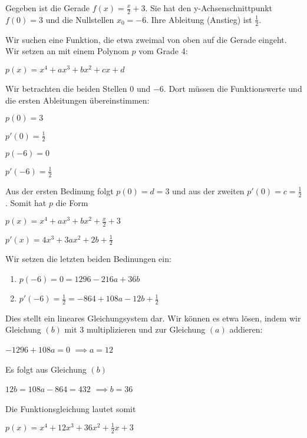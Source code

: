 \item

Gegeben ist die Gerade $f(x) = \frac{x}{2}+3$. Sie hat den y-Achsenschnittpunkt $f(0) = 3$ und die Nullstellen $x_0 = -6$. Ihre Ableitung (Anstieg) ist $\frac{1}{2}$.

Wir suchen eine Funktion, die etwa zweimal von oben auf die Gerade eingeht. Wir setzen an mit einem Polynom $p$ vom Grade 4:

$p(x) = x^4+ax^3+bx^2+cx+d$

Wir betrachten die beiden Stellen $0$ und $-6$. Dort müssen die Funktionswerte und die ersten Ableitungen übereinstimmen:

$p(0) = 3$

$p'(0) = \frac{1}{2}$

$p(-6) = 0$

$p'(-6) = \frac{1}{2}$

Aus der ersten Bedinung folgt $p(0) = d = 3$ und aus der zweiten $p'(0) = c = \frac{1}{2}$. Somit hat $p$ die Form

$p(x) = x^4+ax^3+bx^2+\frac{x}{2}+3$

$p'(x) = 4x^3+3ax^2+2b+\frac{1}{2}$

Wir setzen die letzten beiden Bedinungen ein:

\begin{enumerate}
\item $p(-6) = 0 = 1296 - 216a + 36b$
\item $p'(-6) = \frac{1}{2} = -864 + 108a -12b + \frac{1}{2}$
\end{enumerate}

Dies stellt ein lineares Gleichungsystem dar. Wir können es etwa lösen, indem wir Gleichung $(b)$ mit $3$ multiplizieren und zur Gleichung $(a)$ addieren:

$-1296+108a = 0$
$\implies a=12$

Es folgt aus Gleichung $(b)$

$12b = 108a-864 = 432$
$\implies b=36$

Die Funktionsgleichung lautet somit

$p(x) = x^4 + 12x^3+36x^2+\frac{1}{2}x+3$

